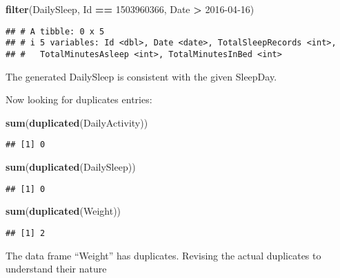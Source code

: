 \documentclass[
]{article}
\newenvironment{Shaded}{\begin{snugshade}}{\end{snugshade}}
\newcommand{\DecValTok}[1]{\textcolor[rgb]{0.00,0.00,0.81}{#1}}
\newcommand{\FunctionTok}[1]{\textcolor[rgb]{0.13,0.29,0.53}{\textbf{#1}}}
\newcommand{\NormalTok}[1]{#1}
\newcommand{\SpecialCharTok}[1]{\textcolor[rgb]{0.81,0.36,0.00}{\textbf{#1}}}
\begin{document}
\begin{Shaded}
\begin{Highlighting}[]
\FunctionTok{filter}\NormalTok{(DailySleep, Id }\SpecialCharTok{==} \DecValTok{1503960366}\NormalTok{, Date }\SpecialCharTok{\textgreater{}} \DecValTok{2016{-}04{-}16}\NormalTok{)}
\end{Highlighting}
\end{Shaded}

\begin{verbatim}
## # A tibble: 0 x 5
## # i 5 variables: Id <dbl>, Date <date>, TotalSleepRecords <int>,
## #   TotalMinutesAsleep <int>, TotalMinutesInBed <int>
\end{verbatim}

The generated DailySleep is consistent with the given SleepDay.

Now looking for duplicates entries:

\begin{Shaded}
\begin{Highlighting}[]
\FunctionTok{sum}\NormalTok{(}\FunctionTok{duplicated}\NormalTok{(DailyActivity))}
\end{Highlighting}
\end{Shaded}

\begin{verbatim}
## [1] 0
\end{verbatim}

\begin{Shaded}
\begin{Highlighting}[]
\FunctionTok{sum}\NormalTok{(}\FunctionTok{duplicated}\NormalTok{(DailySleep))}
\end{Highlighting}
\end{Shaded}

\begin{verbatim}
## [1] 0
\end{verbatim}

\begin{Shaded}
\begin{Highlighting}[]
\FunctionTok{sum}\NormalTok{(}\FunctionTok{duplicated}\NormalTok{(Weight))}
\end{Highlighting}
\end{Shaded}

\begin{verbatim}
## [1] 2
\end{verbatim}

The data frame ``Weight'' has duplicates. Revising the actual duplicates
to understand their nature
\end{document}
